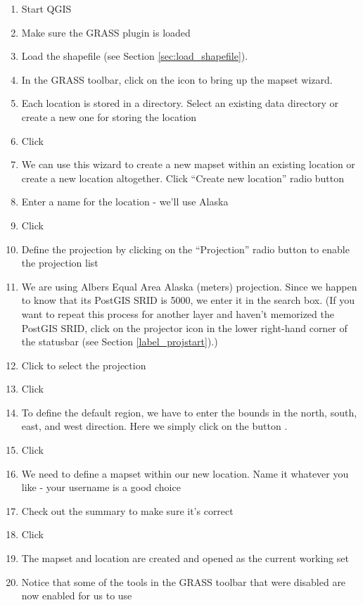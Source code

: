 \begin{enumerate}
  \item Start QGIS
  \item Make sure the GRASS plugin is loaded
  \item Load the  shapefile (see Section \ref{sec:load_shapefile}).
  \item In the GRASS toolbar, click on the  icon to bring up the mapset wizard.
  \item Each location is stored in a directory. Select an existing data 
  directory or create a new one for storing the location
  \item Click  
  \item We can use this wizard to create a new mapset within an existing 
  location or create a new location altogether. Click ``Create new location'' 
  radio button
  \item Enter a name for the location - we'll use Alaska
  \item Click  
  \item Define the projection by clicking on the ``Projection'' radio button 
  to enable the projection list
  \item We are using Albers Equal Area Alaska (meters) projection. Since we happen to know that 
  its PostGIS SRID is 5000, we enter it in the search box. (If you want to repeat this process 
  for another layer and haven't memorized the PostGIS SRID, click on the projector icon in the 
  lower right-hand corner of the statusbar (see Section \ref{label_projstart}).)
  \item Click  to select the projection
  \item Click  
  \item To define the default region, we have to enter the bounds in the north, south, 
  east, and west direction. Here we simply click on the button .
  \item Click  
  \item We need to define a mapset within our new location. Name it whatever 
  you like - your username is a good choice
  \item Check out the summary to make sure it's correct
  \item Click  
  \item The mapset and location are created and opened as the current 
  working set
  \item Notice that some of the tools in the GRASS toolbar that were 
  disabled are now enabled for us to use
\end{enumerate}

